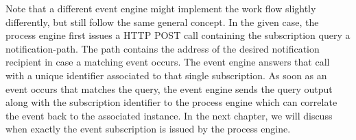 Note that a different event engine might implement the work flow slightly differently, but still follow the same general concept.
In the given case, the process engine first issues a \acs{HTTP} POST call containing the subscription query a notification-path. The path contains the address of the desired notification recipient in case a matching event occurs.
The event engine answers that call with a unique identifier associated to that single subscription.
As soon as an event occurs that matches the query, the event engine sends the query output along with the subscription identifier to the process engine which can correlate the event back to the associated instance.
In the next chapter, we will discuss when exactly the event subscription is issued by the process engine.








